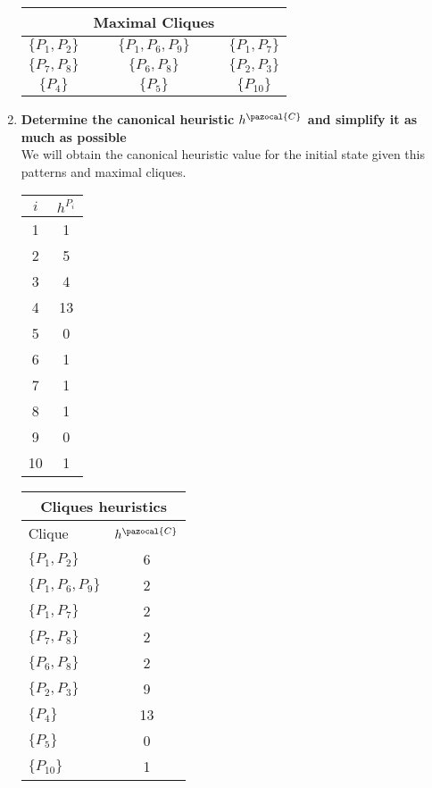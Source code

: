 \documentclass[11pt,a4paper]{article}
\begin{document}
\begin{enumerate}[label=(\alph*), listparindent=1.5em]
	\begin{center}
		\begin{tabular}{c c c}
			 & Maximal Cliques & \\
			\hline \hline
			$\{P_1,P_2\}$ & $\{P_1, P_6, P_9\}$ & $\{P_1, P_7\}$ \\	
			$\{P_7,P_8\}$ & $\{P_6, P_8\}$ 		& $\{P_2, P_3\}$ \\
			$\{P_4\}$ 	  & $\{P_5\}$ 			& $\{P_{10}\}$
		\end{tabular}
	\end{center}
	\item \textbf{Determine the canonical heuristic $h^{\pazocal{C}}$
	and simplify it as much as possible}\\
	We will obtain the canonical heuristic value for the initial state given this patterns and maximal cliques.\\
	\begin{multicols}{3}
		\begin{tabular}{c c}
			$ i $		& $h^{P_i}$\\
			\hline\hline
			1 & 1 \\
			2 & 5 \\
			3 & 4 \\
			4 & 13\\
			5 & 0 \\
			6 & 1 \\
			7 & 1 \\
			8 & 1 \\
			9 & 0 \\
			10& 1 \\
		\end{tabular}

		\begin{tabular}{l | c}
			\multicolumn{2}{c}{Cliques heuristics} \\
			\hline \hline
			Clique & $h^{\pazocal{C}}$\\
			\hline
			$\{P_1,P_2\}$ 		& 6 \\
			$\{P_1, P_6, P_9\}$ & 2 \\
			$\{P_1, P_7\}$ 		& 2 \\
			$\{P_7,P_8\}$ 		& 2 \\
			$\{P_6, P_8\}$ 		& 2 \\
			$\{P_2, P_3\}$ 		& 9 \\
			$\{P_4\}$ 	  		& 13\\
			$\{P_5\}$ 			& 0 \\
			$\{P_{10}\}$		& 1
		\end{tabular}


\end{multicols}
\end{enumerate}
\end{document}
